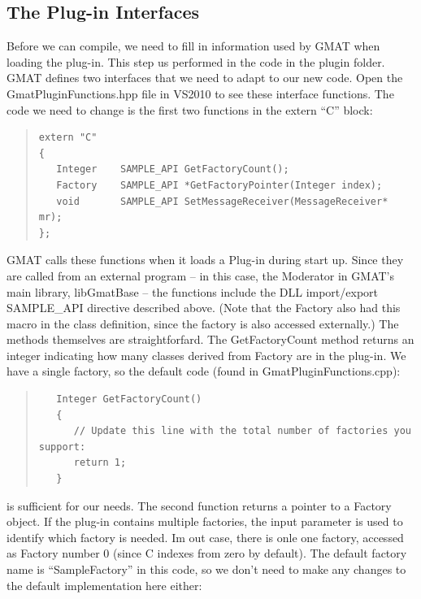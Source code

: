 \documentclass[10pt,letterpaper]{article}
\begin{document}
\subsection{The Plug-in Interfaces}

Before we can compile, we need to fill in information used by GMAT when loading the plug-in.  This step us performed in the code in the plugin folder.  GMAT defines two interfaces that we need to adapt to our new code.  Open the GmatPluginFunctions.hpp file in VS2010 to see these interface functions.  The code we need to change is the first two functions in the extern ``C'' block:

\begin{quote}
\begin{verbatim}
extern "C"
{
   Integer    SAMPLE_API GetFactoryCount();
   Factory    SAMPLE_API *GetFactoryPointer(Integer index);
   void       SAMPLE_API SetMessageReceiver(MessageReceiver* mr);
};
\end{verbatim}
\end{quote}

GMAT calls these functions when it loads a Plug-in during start up.  Since they are called from an external program -- in this case, the Moderator in GMAT's main library, libGmatBase -- the functions include the DLL import/export SAMPLE{\_}API directive described above.  (Note that the Factory also had this macro in the class definition, since the factory is also accessed externally.)  The methods themselves are straightforfard.  The GetFactoryCount method returns an integer indicating how many classes derived from Factory are in the plug-in.  We have a single factory, so the default code (found in GmatPluginFunctions.cpp):

\begin{quote}
\begin{verbatim}
   Integer GetFactoryCount()
   {
      // Update this line with the total number of factories you support:
      return 1;
   }
\end{verbatim}
\end{quote}

is sufficient for our needs.  The second function returns a pointer to a Factory object.  If the plug-in contains multiple factories, the input parameter is used to identify which factory is needed.  Im out case, there is onle one factory, accessed as Factory number 0 (since C indexes from zero by default).  The default factory name is ``SampleFactory'' in this code, so we don't need to make any changes to the default implementation here either:
\end{document}
